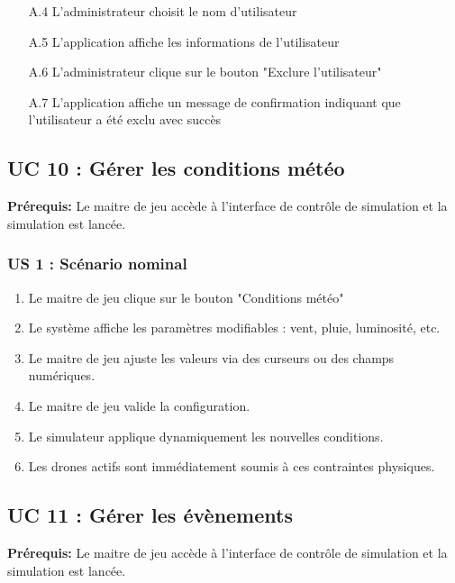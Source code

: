 \documentclass{scrartcl}
\begin{document}
\begin{enumerate}
    \item[A.4] L'administrateur choisit le nom d'utilisateur
    \item[A.5] L'application affiche les informations de l'utilisateur
    \item[A.6] L'administrateur clique sur le bouton "Exclure l'utilisateur"
    \item[A.7] L'application affiche un message de confirmation indiquant que l'utilisateur a été exclu avec succès
\end{enumerate}

\subsection{UC 10 : Gérer les conditions météo}
\textbf{Prérequis:} Le maitre de jeu accède à l’interface de contrôle de simulation et la simulation est lancée.

\subsubsection*{US 1 : Scénario nominal}
\begin{enumerate}
    \item Le maitre de jeu clique sur le bouton "Conditions météo"
    \item Le système affiche les paramètres modifiables : vent, pluie, luminosité, etc.
    \item Le maitre de jeu ajuste les valeurs via des curseurs ou des champs numériques.
    \item Le maitre de jeu valide la configuration.
    \item Le simulateur applique dynamiquement les nouvelles conditions.
    \item Les drones actifs sont immédiatement soumis à ces contraintes physiques.
\end{enumerate}

\subsection{UC 11 : Gérer les évènements}
\textbf{Prérequis:} Le maitre de jeu accède à l’interface de contrôle de simulation et la simulation est lancée.
\end{document}
